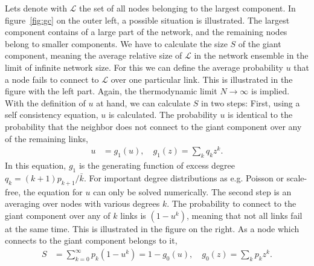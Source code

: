 \documentclass[aps, pre, onecolumn, a4paper, floatfix]{revtex4}
\begin{document}
%
Lets denote with $\mathcal{L}$ the set of all nodes belonging to the largest component. 
In figure~\ref{fig:gc} on the outer left, a possible situation is illustrated. 
The largest component contains of a large part of the network, 
and the remaining nodes belong to smaller components. 
We have to calculate the size $S$ of the giant component, 
meaning the average relative size of $\mathcal{L}$ in the network ensemble 
in the limit of infinite network size. 
For this we can define the average probability $u$ 
that a node fails to connect to $\mathcal{L}$ over one particular link.  
This is illustrated in the figure with the left part. 
Again, the thermodynamic limit $N\to \infty$ is implied. 
With the definition of $u$ at hand, we can calculate $S$ in two steps: 
First, using a self consistency equation, $u$ is calculated. 
The probability $u$ is identical to the probability 
that the neighbor does not connect to the giant component over any of the remaining links, 
\begin{align}
u &= g_1(u),\quad g_1(z)=\sum_k q_k z^k.\label{eq:u}
\end{align}
In this equation, $g_1$ is the generating function 
of excess degree $q_k=(k+1)p_{k+1}/\bar{k}$. 
For important degree distributions as e.g. Poisson or scale-free, 
the equation for $u$ can only be solved numerically. 
The second step is an averaging over nodes with various degrees $k$. 
The probability to connect to the giant component over any of $k$ links is $(1-u^k)$, 
meaning that not all links fail at the same time. 
This is illustrated in the figure on the right. 
As a node which connects to the giant component belongs to it, 
\begin{align}
S &= \sum_{k=0}^{\infty}p_k (1-u^k) = 1-g_0(u),\quad g_0(z)=\sum_k p_k z^k.\label{eq:S}
\end{align}
\end{document}
